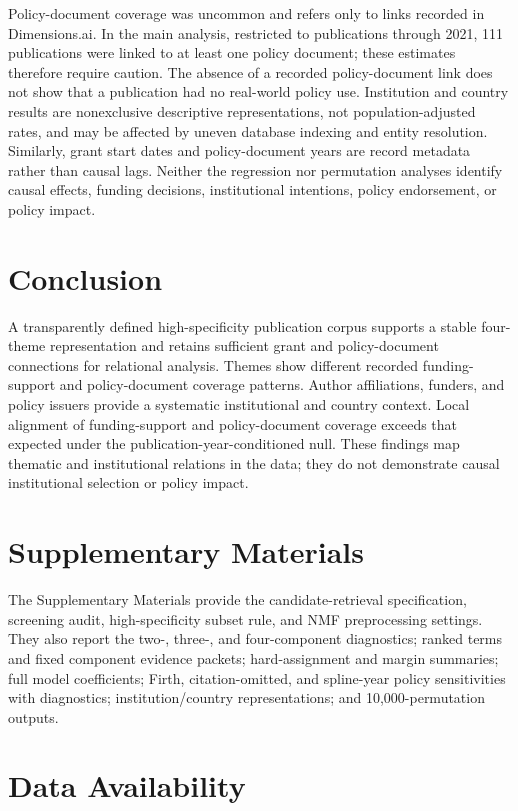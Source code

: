 \documentclass[12pt]{article}
\begin{document}
Policy-document coverage was uncommon and refers only to links recorded in Dimensions.ai. In the main analysis, restricted to publications through 2021, 111 publications were linked to at least one policy document; these estimates therefore require caution. The absence of a recorded policy-document link does not show that a publication had no real-world policy use. Institution and country results are nonexclusive descriptive representations, not population-adjusted rates, and may be affected by uneven database indexing and entity resolution. Similarly, grant start dates and policy-document years are record metadata rather than causal lags. Neither the regression nor permutation analyses identify causal effects, funding decisions, institutional intentions, policy endorsement, or policy impact.

\section{Conclusion}

A transparently defined high-specificity publication corpus supports a stable four-theme representation and retains sufficient grant and policy-document connections for relational analysis. Themes show different recorded funding-support and policy-document coverage patterns. Author affiliations, funders, and policy issuers provide a systematic institutional and country context. Local alignment of funding-support and policy-document coverage exceeds that expected under the publication-year-conditioned null. These findings map thematic and institutional relations in the data; they do not demonstrate causal institutional selection or policy impact.

\section*{Supplementary Materials}

The Supplementary Materials provide the candidate-retrieval specification, screening audit, high-specificity subset rule, and NMF preprocessing settings. They also report the two-, three-, and four-component diagnostics; ranked terms and fixed component evidence packets; hard-assignment and margin summaries; full model coefficients; Firth, citation-omitted, and spline-year policy sensitivities with diagnostics; institution/country representations; and 10,000-permutation outputs.

\section*{Data Availability}
\end{document}
